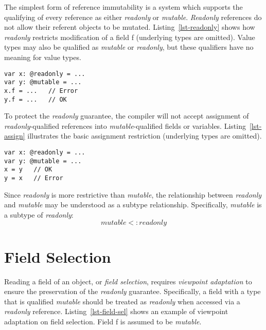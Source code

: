 The simplest form of reference immutability is a system which supports
the qualifying of every reference as either {\em readonly} or {\em mutable}.
{\em Readonly} references do not allow their referent objects to be mutated.
Listing~\ref{lst-readonly} shows how {\em readonly} restricts modification of a field {\cd f}
(underlying types are omitted).
Value types may also be qualified as {\em mutable} or {\em readonly},
but these qualifiers have no meaning for value types.

\begin{lstlisting}[caption={Mutation Restriction},float={htp},label={lst-readonly}]
var x: @readonly = ...
var y: @mutable = ...
x.f = ...   // Error
y.f = ...   // OK
\end{lstlisting}


To protect the {\em readonly} guarantee, the compiler will not accept
assignment of {\em readonly}-qualified references into {\em mutable}-qualified
fields or variables. Listing~\ref{lst-assign} illustrates the basic assignment restriction
(underlying types are omitted).
\begin{lstlisting}[caption={Assignment Restriction},float={htp},label={lst-assign}]
var x: @readonly = ...
var y: @mutable = ...
x = y   // OK
y = x   // Error
\end{lstlisting}

Since {\em readonly} is more restrictive than {\em mutable},
the relationship between {\em readonly} and {\em mutable}
may be understood as a subtype relationship.
Specifically, {\em mutable} is a subtype of {\em readonly}:
$$mutable <: readonly$$





\section{Field Selection} \label{sec-field-sel}

Reading a field of an object, or {\em field selection}, requires {\em viewpoint adaptation}
to ensure the preservation of the {\em readonly} guarantee.
Specifically, a field with a type that is qualified {\em mutable} should be treated as
{\em readonly} when accessed via a {\em readonly} reference.
Listing~\ref{lst-field-sel} shows an example of viewpoint adaptation on field selection.
Field {\cd f} is assumed to be {\em mutable}.

